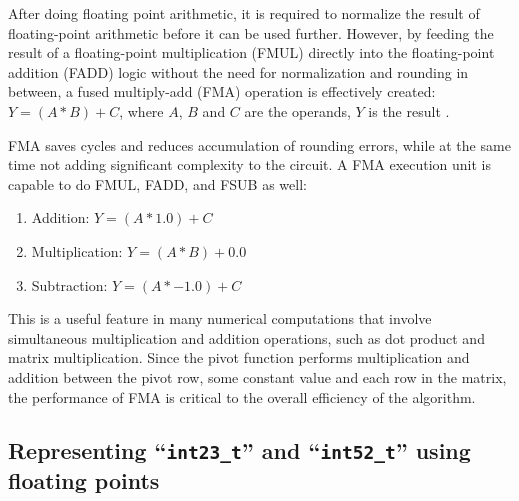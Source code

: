 \documentclass[logo,bsc,singlespacing,parskip]{infthesis}
\newenvironment{compactlist}
{ \begin{enumerate}
    \setlength{\itemsep}{0pt}
    \setlength{\parskip}{0pt}
    \setlength{\parsep}{0pt}     
}
{ \end{enumerate} }
\begin{document}
After doing floating point arithmetic, it is required to normalize the result of
floating-point arithmetic before it can be used further. However, by feeding the
result of a floating-point multiplication (FMUL) directly into the
floating-point addition (FADD) logic without the need for normalization and
rounding in between, a fused multiply-add (FMA) operation is effectively
created: 
\begin{math}Y = (A * B) + C \end{math}, where 
\begin{math}A\end{math},
\begin{math}B\end{math} and
\begin{math}C\end{math} are the operands, 
 \begin{math}Y\end{math} is the result \cite{CARD}.

FMA saves cycles and reduces accumulation of rounding errors, while at the same
time not adding significant complexity to the circuit. A FMA execution unit is
capable to do FMUL, FADD, and FSUB as well: 
\begin{compactlist} 
\item[] Addition: \begin{math}Y = (A * 1.0) + C \end{math} 
\item[] Multiplication: \begin{math} Y = (A * B) + 0.0 \end{math} 
\item[] Subtraction: \begin{math} Y = (A * -1.0) + C\end{math} 
\end{compactlist} 

This is a useful feature in many numerical computations that involve
simultaneous multiplication and addition operations, such as dot product and
matrix multiplication. Since the pivot function performs multiplication and
addition between the pivot row, some constant value and each row in the matrix,
the performance of FMA is critical to the overall efficiency of the algorithm. 

\subsection{Representing ``\texttt{int23\_t}'' and ``\texttt{int52\_t}'' using
floating points}
\label{sec:fpe2}
\end{document}
